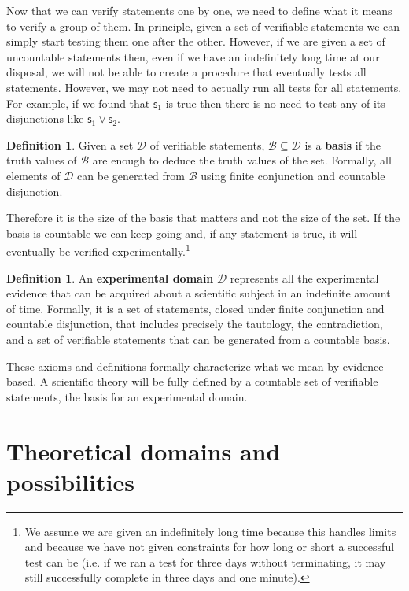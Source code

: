 \documentclass[letterpaper]{article}
\theoremstyle{plain}%
\theoremstyle{definition}
\newtheorem{defn}[thrm]{Definition}
\theoremstyle{remark}
\numberwithin{equation}{section}
\def\OR{\vee}
\newcommand{\stmt}[1][s] {\mathsf{#1}}
\newcommand{\edomain}[1][D] {\mathcal{#1}}
\newcommand{\basis}[1][B] {\mathcal{#1}} %
\begin{document}
Now that we can verify statements one by one, we need to define what it means to verify a group of them. In principle, given a set of verifiable statements we can simply start testing them one after the other. However, if we are given a set of uncountable statements then, even if we have an indefinitely long time at our disposal, we will not be able to create a procedure that eventually tests all statements. However, we may not need to actually run all tests for all statements. For example, if we found that $\stmt_1$ is true then there is no need to test any of its disjunctions like $\stmt_1 \OR \stmt_2$.

\begin{defn}
	Given a set $\edomain$ of verifiable statements, $\basis \subseteq \edomain$ is a \textbf{basis} if the truth values of $\basis$ are enough to deduce the truth values of the set. Formally, all elements of $\edomain$ can be generated from $\basis$ using finite conjunction and countable disjunction.
\end{defn}

Therefore it is the size of the basis that matters and not the size of the set. If the basis is countable we can keep going and, if any statement is true, it will eventually be verified experimentally.\footnote{We assume we are given an indefinitely long time because this handles limits and because we have not given constraints for how long or short a successful test can be (i.e. if we ran a test for three days without terminating, it may still successfully complete in three days and one minute).}

\begin{defn}
	An \textbf{experimental domain} $\edomain$ represents all the experimental evidence that can be acquired about a scientific subject in an indefinite amount of time. Formally, it is a set of statements, closed under finite conjunction and countable disjunction, that includes precisely the tautology, the contradiction, and a set of verifiable statements that can be generated from a countable basis.
\end{defn}

These axioms and definitions formally characterize what we mean by evidence based. A scientific theory will be fully defined by a countable set of verifiable statements, the basis for an experimental domain.

\section{Theoretical domains and possibilities}
\end{document}
